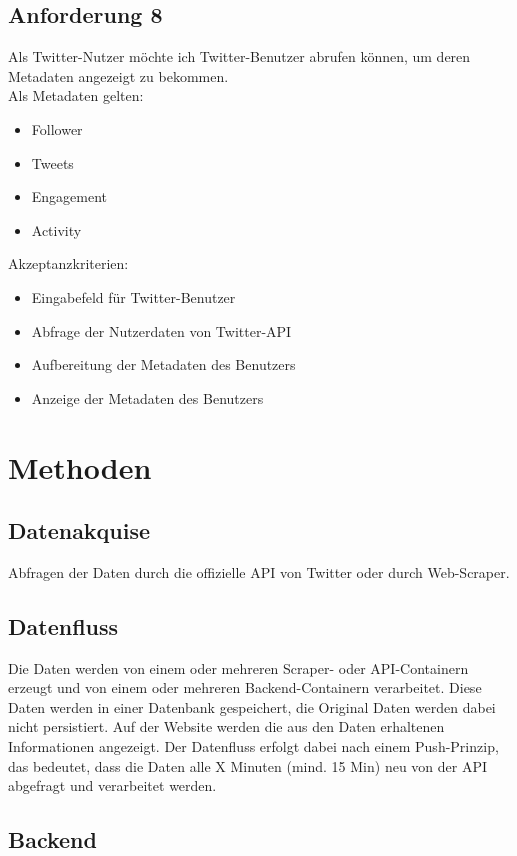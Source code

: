 \documentclass[conference]{IEEEtran}
\begin{document}
\subsection*{Anforderung 8}
Als Twitter-Nutzer möchte ich Twitter-Benutzer abrufen können,
um deren Metadaten angezeigt zu bekommen.
\\
Als Metadaten gelten:
\begin{itemize}
        \item Follower
        \item Tweets
        \item Engagement
        \item Activity
\end{itemize}
Akzeptanzkriterien:
\begin{itemize}
        \item Eingabefeld für Twitter-Benutzer
        \item Abfrage der Nutzerdaten von Twitter-API
        \item Aufbereitung der Metadaten des Benutzers
        \item Anzeige der Metadaten des Benutzers
\end{itemize}


\section{Methoden}

\subsection*{Datenakquise}

Abfragen der Daten durch die offizielle API von Twitter oder durch Web-Scraper.

\subsection*{Datenfluss}
Die Daten werden von einem oder mehreren Scraper- oder API-Containern erzeugt und von einem oder mehreren Backend-Containern verarbeitet.
Diese Daten werden in einer Datenbank gespeichert, die Original Daten werden dabei nicht persistiert.
Auf der Website werden die aus den Daten erhaltenen Informationen angezeigt.
Der Datenfluss erfolgt dabei nach einem Push-Prinzip, das bedeutet, dass die Daten alle X Minuten (mind. 15 Min) neu von der API abgefragt und verarbeitet werden.

\subsection*{Backend}
\end{document}
